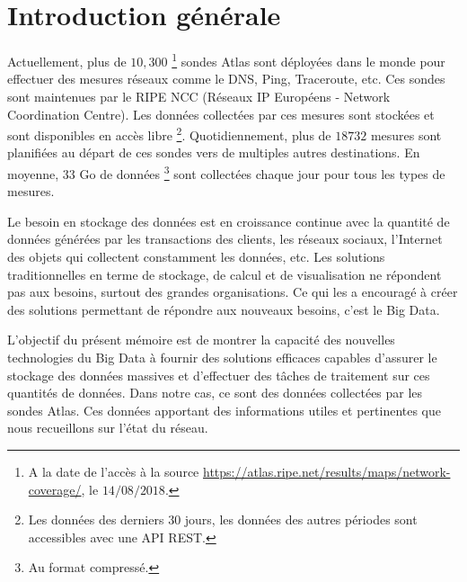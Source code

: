 \chapter*{Introduction générale}



Actuellement, plus de $ 10,300 $ \footnote{A la date de l'accès à la source \url{https://atlas.ripe.net/results/maps/network-coverage/}, le $14/08/2018$.} sondes Atlas sont déployées dans le monde pour effectuer des mesures réseaux comme le DNS, Ping, Traceroute, etc. Ces sondes sont maintenues par le RIPE NCC (Réseaux IP Européens - Network Coordination Centre).  Les données collectées par ces mesures sont  stockées et sont disponibles en accès libre \footnote{Les données des derniers $30$ jours, les données des autres périodes sont accessibles avec une API REST.}. Quotidiennement, plus de $ 18732 $ mesures sont planifiées au départ de ces sondes vers de multiples  autres destinations. En moyenne, $33$ Go de données \footnote{Au format compressé.} sont  collectées chaque jour pour tous les types de mesures.


Le besoin en stockage des données est en croissance continue avec la quantité de données générées par les transactions des clients, les réseaux sociaux, l'Internet des objets qui collectent constamment les données, etc.  Les solutions traditionnelles en terme de stockage, de calcul et de visualisation ne répondent pas aux besoins, surtout des grandes organisations. Ce qui les a encouragé  à  créer des solutions permettant de répondre aux nouveaux besoins, c'est le Big Data.


L'objectif du présent mémoire est de montrer la capacité des nouvelles technologies du Big Data à fournir des solutions efficaces capables d'assurer le stockage des données massives et d'effectuer des tâches de traitement sur ces quantités de données. Dans notre cas, ce sont des données 
collectées par les sondes Atlas. Ces  données apportant des informations utiles et pertinentes que nous recueillons sur l'état du réseau.



